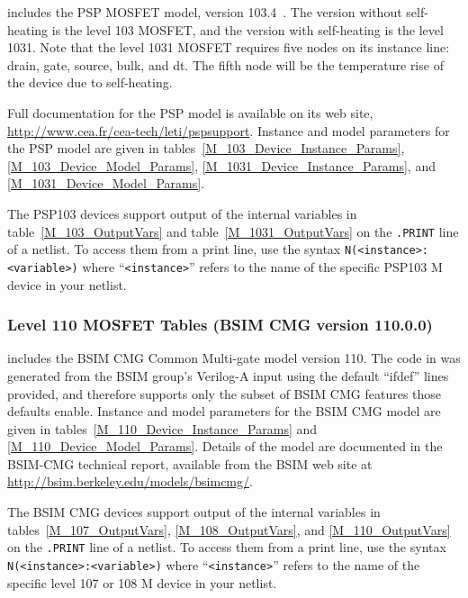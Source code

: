 \Xyce{} includes the PSP MOSFET model, version 103.4~\cite{PSP:2006}.
The version without self-heating is the level 103 MOSFET, and the
version with self-heating is the level 1031.  Note that the level 1031
MOSFET requires five nodes on its instance line: drain, gate, source,
bulk, and dt.  The fifth node will be the temperature rise of the
device due to self-heating.

Full documentation for the PSP model is available on its web site,
\url{http://www.cea.fr/cea-tech/leti/pspsupport}.  Instance and model
parameters for the PSP model are given in
tables~\ref{M_103_Device_Instance_Params}, \ref{M_103_Device_Model_Params},
\ref{M_1031_Device_Instance_Params}, and \ref{M_1031_Device_Model_Params}.

The PSP103 devices support output of the internal variables in
table~\ref{M_103_OutputVars} and table~\ref{M_1031_OutputVars} on the \texttt{.PRINT} line of a netlist.
To access them from a print line, use the syntax
\texttt{N(<instance>:<variable>)} where ``\texttt{<instance>}'' refers to the
name of the specific PSP103 M device in your netlist.








\clearpage
\subsubsection{Level 110 MOSFET Tables (BSIM CMG version 110.0.0)}
\Xyce{} includes the BSIM CMG Common Multi-gate model version 110.
The code in \Xyce{} was generated from the BSIM group's Verilog-A
input using the default ``ifdef'' lines provided, and therefore
supports only the subset of BSIM CMG features those defaults enable.
Instance and model parameters for the BSIM CMG model are given in
tables~\ref{M_110_Device_Instance_Params} and
\ref{M_110_Device_Model_Params}.  Details of the model are documented
in the BSIM-CMG technical report\cite{BSIMCMG:Manual}, available from
the BSIM web site at
\url{http://bsim.berkeley.edu/models/bsimcmg/}.

The BSIM CMG devices support output of the internal variables in
tables~\ref{M_107_OutputVars}, \ref{M_108_OutputVars}, and  \ref{M_110_OutputVars} on the \texttt{.PRINT} line of a netlist.
To access them from a print line, use the syntax
\texttt{N(<instance>:<variable>)} where ``\texttt{<instance>}'' refers to the
name of the specific level 107 or 108 M device in your netlist.

